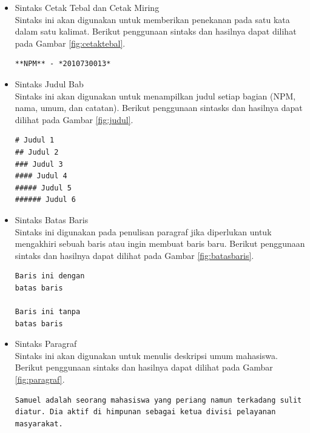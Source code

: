 \begin{itemize}
\item Sintaks Cetak Tebal dan Cetak Miring\\
Sintaks ini akan digunakan untuk memberikan penekanan pada satu kata dalam satu
kalimat. Berikut penggunaan sintaks dan hasilnya dapat dilihat pada Gambar
\ref{fig:cetaktebal}.
\begin{lstlisting}[basicstyle=\footnotesize]
**NPM** - *2010730013*
\end{lstlisting}
\item Sintaks Judul Bab\\
Sintaks ini akan digunakan untuk menampilkan judul setiap bagian (NPM, nama,
umum, dan catatan). Berikut penggunaan sintasks dan hasilnya dapat dilihat pada
Gambar \ref{fig:judul}.
\begin{lstlisting}[basicstyle=\footnotesize]
# Judul 1
## Judul 2
### Judul 3
#### Judul 4
##### Judul 5
###### Judul 6
\end{lstlisting}
\item Sintaks Batas Baris\\
Sintaks ini digunakan pada penulisan paragraf jika diperlukan untuk mengakhiri
sebuah baris atau ingin membuat baris baru. Berikut penggunaan sintaks dan
hasilnya dapat dilihat pada Gambar \ref{fig:batasbaris}.
\begin{lstlisting}[basicstyle=\footnotesize]
Baris ini dengan   
batas baris

Baris ini tanpa
batas baris
\end{lstlisting}
\item Sintaks Paragraf\\
Sintaks ini akan digunakan untuk menulis deskripsi umum mahasiswa. Berikut
penggunaan sintaks dan hasilnya dapat dilihat pada Gambar \ref{fig:paragraf}.
\begin{lstlisting}[basicstyle=\footnotesize]
Samuel adalah seorang mahasiswa yang periang namun terkadang sulit diatur. Dia aktif di himpunan sebagai ketua divisi pelayanan masyarakat.


\end{lstlisting}
\end{itemize}
